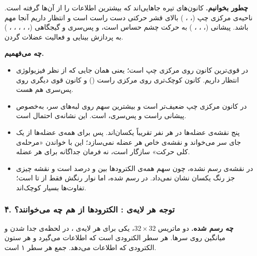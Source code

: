 \textbf{چطور بخوانیم.} کانون‌های تیره جاهایی‌اند که  بیشترین اطلاعات را از آن‌ها گرفته است. ناحیه‌ی مرکزی چپ (، ، ) بالای قشر حرکتی دست راست است و انتظار داریم آنجا مهم باشد. پیشانی (، ، ، ) به حرکت چشم حساس است، و پس‌سری و گیجگاهی (، ، ، ، ، ) به پردازش بینایی و فعالیت عضلات گردن.

\textbf{چه می‌فهمیم.}
\begin{itemize}
\item در  قوی‌ترین کانون روی مرکزی چپ است؛ یعنی همان جایی که از نظر فیزیولوژی انتظار داریم. کانون کوچک‌تری روی مرکزی راست () و کانون قوی دیگری روی پس‌سری هم هست.
\item در  کانون مرکزی چپ ضعیف‌تر است و بیشترین سهم روی لبه‌های سر، به‌خصوص پیشانی راست و پس‌سری، است. این نشانه‌ی احتمال  است.
\item پنج نقشه‌ی عضله‌ها در هر نفر تقریباً یکسان‌اند. پس  برای همه‌ی عضله‌ها از یک جای سر می‌خواند و نقشه‌ی خاص هر عضله نمی‌سازد؛ این با خواندن «مرحله‌ی کلی حرکت» سازگار است، نه فرمان جداگانه برای هر عضله.
\item در  نقشه‌ی  رسم نشده، چون سهم همه‌ی الکترودها بین  و  درصد است و نقشه چیزی جز رنگ یکسان نشان نمی‌داد. در  رسم شده، اما نوار رنگش فقط از  تا  است؛ تفاوت‌ها بسیار کوچک‌اند.
\end{itemize}


\subsubsection*{۴. توجه هر لایه‌ی : الکترودها از هم چه می‌خوانند؟}

\textbf{چه رسم شده.} دو ماتریس $32\times32$، یکی برای هر لایه‌ی ، در لحظه‌ی جدا شدن و میانگین روی سرها. هر سطر الکترودی است که اطلاعات می‌گیرد و هر ستون الکترودی که اطلاعات می‌دهد. جمع هر سطر ۱ است.

